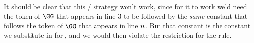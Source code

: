 \begin{gproof}[\label{GQDExampleK}]
\end{gproof}
It should be clear that this / strategy won't work, since for it to work we'd need the token of $\GG$ that appears in line 3 to be followed by the \emph{same} constant that follows the token of $\GG$ that appears in line $n$. 
But that constant is the constant we substitute in for , and we would then violate the restriction for the rule. 

